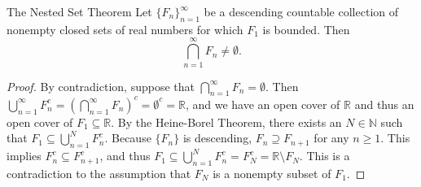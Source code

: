 \begin{namedthm*}{The Nested Set Theorem}
Let $\{F_n\}_{n=1}^\infty$ be a descending countable collection of nonempty closed sets of real numbers for which $F_1$ is bounded.
Then
\[
    \bigcap_{n=1}^\infty F_n \neq \emptyset.
\]
\end{namedthm*}
\begin{proof} 
By contradiction, suppose that $\bigcap_{n=1}^\infty F_n = \emptyset$. 
Then $\bigcup_{n=1}^\infty F_n^c = (\bigcap_{n=1}^\infty F_n)^c  = \emptyset^c = \mathbb{R}$, and we have an open cover of $\mathbb{R}$ and thus an open cover of $F_1 \subseteq \mathbb{R}$. 
By the Heine-Borel Theorem, there exists an $N \in \mathbb {N}$ such that $F_1 \subseteq \bigcup_{n=1}^N F_n^c$.  
Because $\{F_n\}$ is descending, $F_n \supseteq F_{n+1}$ for any $n \ge 1$. 
This implies $F_{n}^c \subseteq F_{n+1}^c$, and thus $F_1 \subseteq \bigcup_{n=1}^N F_n^c = F_N^c = \mathbb{R}\setminus F_N$.
This is a contradiction to the assumption that $F_N$ is a nonempty subset of $F_1$.
\end{proof}

